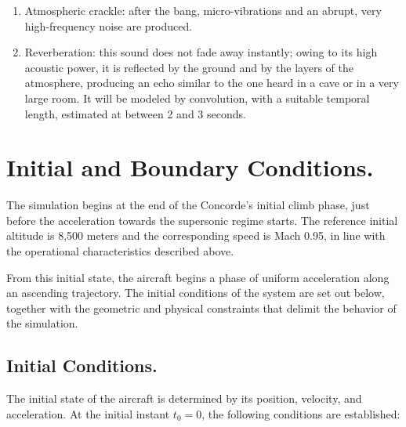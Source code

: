 \documentclass[10.5pt]{article}
\begin{document}
\begin{itemize}
\begin{enumerate}
			\item Atmospheric crackle: after the bang, micro-vibrations and an abrupt, very high-frequency noise are produced.
			
			\item Reverberation: this sound does not fade away instantly; owing to its high acoustic power, it is reflected by the ground and by the layers of the atmosphere, producing an echo similar to the one heard in a cave or in a very large room. It will be modeled by convolution, with a suitable temporal length, estimated at between 2 and 3 seconds. 
			
		\end{enumerate}
	\end{itemize}
	
	\newpage
	
	\section{Initial and Boundary Conditions.}
	
	The simulation begins at the end of the Concorde's initial climb phase, just before the acceleration towards the supersonic regime starts. The reference initial altitude is 8,500 meters and the corresponding speed is Mach 0.95, in line with the operational characteristics described above.
	
	From this initial state, the aircraft begins a phase of uniform acceleration along an ascending trajectory. The initial conditions of the system are set out below, together with the geometric and physical constraints that delimit the behavior of the simulation.
	
	\subsection{Initial Conditions.}
	
	The initial state of the aircraft is determined by its position, velocity, and acceleration. At the initial instant $t_0=0$, the following conditions are established:
	
\end{document}
